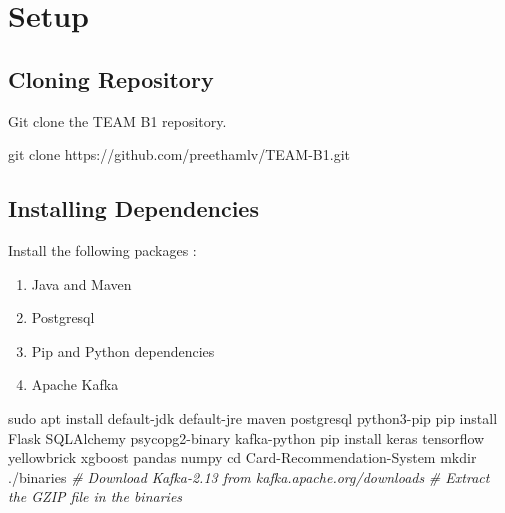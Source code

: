 \documentclass[
]{article}
\author{}
\date{}
\newenvironment{Shaded}{}{}
\newcommand{\BuiltInTok}[1]{#1}
\newcommand{\CommentTok}[1]{\textcolor[rgb]{0.38,0.63,0.69}{\textit{#1}}}
\newcommand{\ExtensionTok}[1]{#1}
\newcommand{\FunctionTok}[1]{\textcolor[rgb]{0.02,0.16,0.49}{#1}}
\newcommand{\NormalTok}[1]{#1}
\begin{document}
\hypertarget{setup}{%
\section{Setup}\label{setup}}

\hypertarget{cloning-repository}{%
\subsection{Cloning Repository}\label{cloning-repository}}

Git clone the TEAM B1 repository.

\begin{Shaded}
\begin{Highlighting}[]
\FunctionTok{git}\NormalTok{ clone https://github.com/preethamlv/TEAM{-}B1.git}
\end{Highlighting}
\end{Shaded}

\hypertarget{installing-dependencies}{%
\subsection{Installing Dependencies}\label{installing-dependencies}}

Install the following packages :

\begin{enumerate}
\def\labelenumi{\arabic{enumi}.}
\item
  Java and Maven
\item
  Postgresql
\item
  Pip and Python dependencies
\item
  Apache Kafka
\end{enumerate}

\begin{Shaded}
\begin{Highlighting}[]
\FunctionTok{sudo}\NormalTok{ apt install default{-}jdk default{-}jre maven postgresql python3{-}pip}
\ExtensionTok{pip}\NormalTok{ install Flask SQLAlchemy psycopg2{-}binary kafka{-}python }
\ExtensionTok{pip}\NormalTok{ install keras tensorflow yellowbrick xgboost pandas numpy}
\BuiltInTok{cd}\NormalTok{ Card{-}Recommendation{-}System}
\FunctionTok{mkdir}\NormalTok{ ./binaries}
\CommentTok{\# Download Kafka{-}2.13 from kafka.apache.org/downloads}
\CommentTok{\# Extract the GZIP file in the \textquotesingle{}binaries\textquotesingle{}}
\end{Highlighting}
\end{Shaded}
\end{document}
